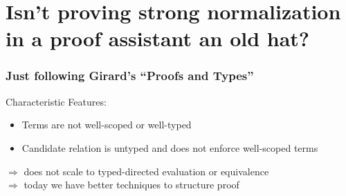 \documentclass{beamer}
\newcommand{\red}{\longrightarrow}
\begin{document}











\section{Isn't proving strong normalization in a proof assistant an old hat?}

\begin{frame}\frametitle{Just following Girard's ``Proofs and Types''}

Characteristic Features:
  \begin{itemize}
    \item Terms are not well-scoped or well-typed
    \item Candidate relation is untyped and does not enforce
      well-scoped terms
  \end{itemize}


$\Longrightarrow$ does not scale to typed-directed evaluation or equivalence\\
$\Longrightarrow$ today we have better techniques to structure proof


\end{frame}
\end{document}
